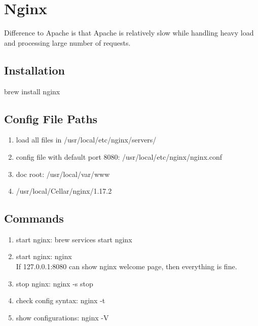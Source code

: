\newpage
\section{Nginx} 
Difference to Apache is that Apache is relatively slow while handling heavy load and processing large number of requests.
    \subsection{Installation}
        \colorbox{gray!30}{brew install nginx}
    \subsection{Config File Paths}
    \begin{enumerate}
        \item load all files in \colorbox{gray!30}{/usr/local/etc/nginx/servers/}
        \item config file with default port 8080: \colorbox{gray!30}{/usr/local/etc/nginx/nginx.conf} 
        \item doc root: \colorbox{gray!30}{/usr/local/var/www}
        \item \colorbox{gray!30}{/usr/local/Cellar/nginx/1.17.2}
    \end{enumerate}
    
    \subsection{Commands}
    \begin{enumerate}
        \item start nginx: \colorbox{gray!30}{brew services start nginx}
        \item start nginx: \colorbox{gray!30}{nginx} \\
        If 127.0.0.1:8080 can show nginx welcome page, then everything is fine.
        \item stop nginx: \colorbox{gray!30}{nginx -s stop}
        \item check config syntax: \colorbox{gray!30}{nginx -t}
        \item show configurations: \colorbox{gray!30}{nginx -V}
    \end{enumerate}
    
